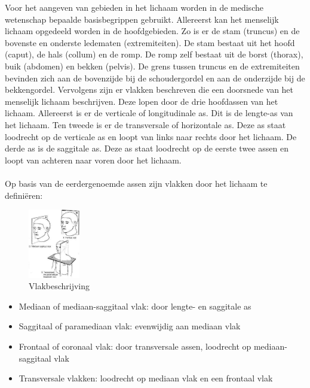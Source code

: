 Voor het aangeven van gebieden in het lichaam worden in de medische wetenschap bepaalde basisbegrippen gebruikt. 
Allereerst kan het menselijk lichaam opgedeeld worden in de hoofdgebieden. 
Zo is er de stam (truncus) en de bovenste en onderste ledematen (extremiteiten). 
De stam bestaat uit het hoofd (caput), de hals (collum) en de romp. 
De romp zelf bestaat uit de borst (thorax), buik (abdomen) en bekken (pelvis). 
De grens tussen truncus en de extremiteiten bevinden zich aan de bovenzijde bij de schoudergordel en aan de onderzijde bij de bekkengordel. 
Vervolgens zijn er vlakken beschreven die een doorsnede van het menselijk lichaam beschrijven. 
Deze lopen door de drie hoofdassen van het lichaam. 
Allereerst is er de verticale of longitudinale as. 
Dit is de lengte-as van het lichaam. 
Ten tweede is er de transversale of horizontale as. 
Deze as staat loodrecht op de verticale as en loopt van links naar rechts door het lichaam. 
De derde as is de saggitale as. 
Deze as staat loodrecht op de eerste twee assen en loopt van achteren naar voren door het lichaam. 
\\
\\
Op basis van de eerdergenoemde assen zijn vlakken door het lichaam te defini\"{e}ren:
\begin{figure}
\begin{center}
\includegraphics[width=0.2\textwidth]{sesam}
\caption{Vlakbeschrijving}
\end{center}
\label{fig:sesam}
\end{figure}

\begin{itemize}
	\item Mediaan of mediaan-saggitaal vlak: door lengte- en saggitale as
	\item Saggitaal of paramediaan vlak: evenwijdig aan mediaan vlak
	\item Frontaal of coronaal vlak: door transversale assen, loodrecht op mediaan-saggitaal vlak
	\item Transversale vlakken: loodrecht op mediaan vlak en een frontaal vlak
\end{itemize}

